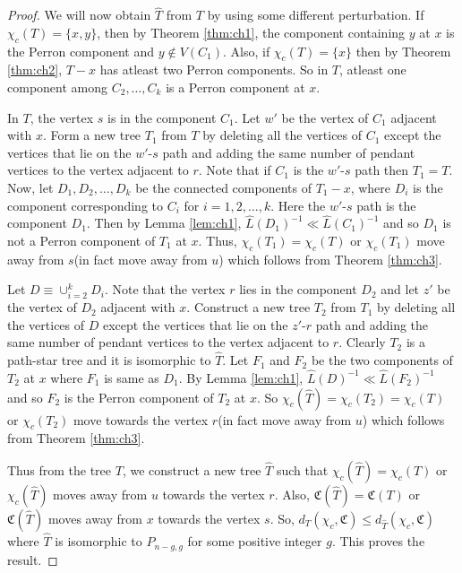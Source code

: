 \documentclass[11pt]{article}
\begin{document}
\begin{proof}
We will now obtain $\hat{T}$ from $T$ by using some different perturbation. If $\chi_c(T)=\{x,y\}$, then by Theorem \ref{thm:ch1}, the component containing $y$ at $x$ is the Perron component and $y\notin V(C_1)$. Also, if $\chi_c(T)=\{x\}$ then by Theorem \ref{thm:ch2}, $T-x$ has atleast two Perron components. So in $T$, atleast one component among $C_2,\ldots,C_k$ is a Perron component at $x$. 

In $T$, the vertex $s$ is in the component $C_1$. Let $w'$ be the vertex of $C_1$ adjacent with $x$. Form a new tree $T_1$ from $T$  by deleting all the vertices of $C_1$ except the vertices that lie on the $w'$-$s$ path and adding the same number of pendant vertices to the vertex adjacent to $r$. Note that if $C_1$ is the $w'$-$s$ path then $T_1=T$. Now, let $D_1,D_2,\ldots,D_k$ be the connected components of $T_1-x$, where $D_i$ is the component corresponding to $C_i$ for $i=1,2,\ldots,k$. Here the $w'$-$s$ path is the component $D_1$. Then by Lemma \ref{lem:ch1}, $\hat{L}(D_1)^{-1}\ll\hat{L}(C_1)^{-1}$ and so $D_1$ is not a Perron component of $T_1$ at $x$. Thus, $\chi_c(T_1)=\chi_c(T)$ or $\chi_c(T_1)$ move away from $s$(in fact move away from $u$) which follows from Theorem \ref{thm:ch3}. 

Let $D\equiv \cup_{i=2}^kD_i$. Note that the vertex $r$ lies in the component $D_2$ and let $z'$ be the vertex of $D_2$ adjacent with $x$. Construct a new tree $T_2$  from $T_1$ by deleting all the vertices of $D$ except the vertices that lie on the $z'$-$r$ path and adding the same number of pendant vertices to the vertex adjacent to $r$. Clearly $T_2$ is a path-star tree and it is isomorphic to $\hat{T}$. Let $F_1$ and $F_2$ be the two components of $T_2$ at $x$ where $F_1$ is same as $D_1$. By Lemma \ref{lem:ch1}, $\hat{L}(D)^{-1}\ll\hat{L}(F_2)^{-1}$ and so $F_2$ is the Perron component of $T_2$ at $x$. So $\chi_c(\hat{T})=\chi_c(T_2)=\chi_c(T)$ or $\chi_c(T_2)$ move towards the vertex $r$(in fact move away from $u$) which follows from Theorem \ref{thm:ch3}.

Thus from the tree $T$, we construct a new tree $\hat{T}$ such that $\chi_c(\hat{T})=\chi_c(T)$ or $\chi_c(\hat{T})$ moves away from $u$ towards the vertex $r$. Also, $\mathfrak{C}(\hat{T})=\mathfrak{C}(T)$ or $\mathfrak{C}(\hat{T})$ moves away from $x$ towards the vertex $s$. So, $d_T(\chi_c,\mathfrak{C})\leq d_{\hat{T}}(\chi_c,\mathfrak{C})$ where $\hat{T}$ is isomorphic to $P_{n-g,g}$ for some positive integer $g$. This proves the result.
\end{proof}
\end{document}
